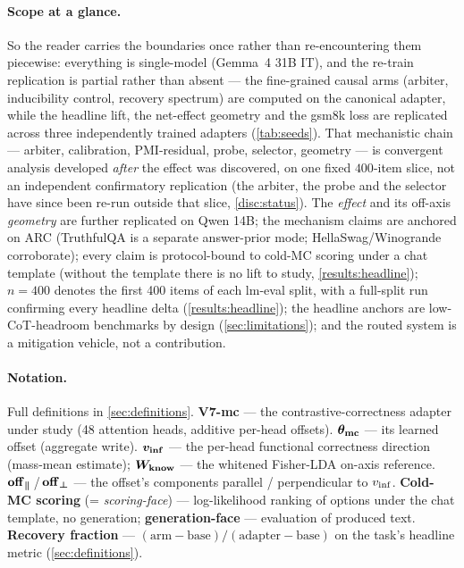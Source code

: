 \paragraph{Scope at a glance.}
So the reader carries the boundaries once rather than re-encountering them
piecewise: everything is single-model (Gemma~4 31B IT), and the re-train replication
is partial rather than absent --- the fine-grained causal arms (arbiter, inducibility
control, recovery spectrum) are computed on the canonical adapter, while the headline
lift, the net-effect geometry and the gsm8k loss are replicated across three
independently trained adapters (\cref{tab:seeds}). That mechanistic chain ---
arbiter, calibration, PMI-residual, probe, selector, geometry --- is convergent
analysis developed \emph{after} the effect was discovered, on one fixed $400$-item
slice, not an independent confirmatory replication (the arbiter, the probe and the
selector have since been re-run outside that slice, \cref{disc:status}). The
\emph{effect} and its off-axis
\emph{geometry} are further replicated on
Qwen 14B; the mechanism claims are anchored on ARC (TruthfulQA is a separate
answer-prior mode; HellaSwag/Winogrande corroborate); every claim is protocol-bound
to cold-MC scoring under a chat template (without the template there is no lift to
study, \cref{results:headline}); $n{=}400$ denotes the first 400 items of each
lm-eval split, with a full-split run confirming every headline delta
(\cref{results:headline}); the headline anchors are low-CoT-headroom benchmarks by
design (\cref{sec:limitations}); and the routed system is a mitigation vehicle, not
a contribution.

\paragraph{Notation.}
Full definitions in \cref{sec:definitions}. \textbf{V7-mc} --- the
contrastive-correctness adapter under study (48 attention heads, additive per-head
offsets). $\boldsymbol{\theta_{\mathrm{mc}}}$ --- its learned offset (aggregate write).
$\boldsymbol{v_{\mathrm{inf}}}$ --- the per-head functional correctness direction (mass-mean
estimate); $\boldsymbol{W_{\mathrm{know}}}$ --- the whitened Fisher-LDA on-axis reference.
$\boldsymbol{\mathrm{off}_{\parallel}}$\,/\,$\boldsymbol{\mathrm{off}_{\perp}}$ --- the offset's components
parallel / perpendicular to $v_{\mathrm{inf}}$. \textbf{Cold-MC scoring} (= \emph{scoring-face})
--- log-likelihood ranking of options under the chat template, no generation;
\textbf{generation-face} --- evaluation of produced text. \textbf{Recovery
fraction} --- $(\mathrm{arm} - \mathrm{base})/(\mathrm{adapter} - \mathrm{base})$ on
the task's headline metric (\cref{sec:definitions}).
